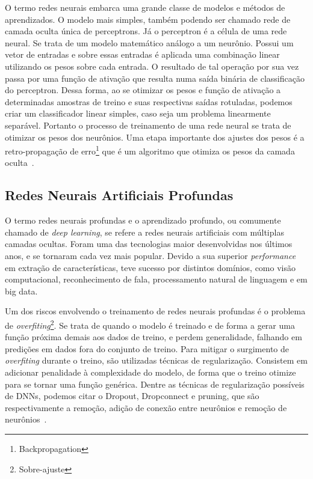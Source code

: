 O termo redes neurais embarca uma grande classe de modelos e métodos de aprendizados. O modelo mais simples, também podendo ser chamado rede de camada oculta única de perceptrons. Já o  perceptron é a célula de uma rede neural. Se trata de um modelo matemático análogo a um neurônio. Possui um vetor de entradas e sobre essas entradas é aplicada uma combinação linear utilizando os pesos sobre cada entrada. O resultado de tal operação por sua vez passa por uma função de ativação que resulta numa saída binária de classificação do perceptron. Dessa forma, ao se otimizar os pesos e função de ativação a determinadas amostras de treino e suas respectivas saídas rotuladas, podemos criar um classificador linear simples, caso seja um problema linearmente separável. Portanto o processo de treinamento de uma rede neural se trata de otimizar os pesos dos neurônios. Uma etapa importante dos ajustes dos pesos é a retro-propagação de erro\footnote{Backpropagation} que é um algoritmo que otimiza os pesos da camada oculta~\cite{hastie01statisticallearning}.

\subsection{Redes Neurais Artificiais Profundas}\label{sec:Cap2_redes_neurais_profundas}
O termo redes neurais profundas e o aprendizado profundo, ou comumente chamado de \textit{deep learning}, se refere a redes neurais artificiais com múltiplas camadas ocultas. Foram uma das tecnologias maior desenvolvidas nos últimos anos, e se tornaram cada vez mais popular. Devido a sua superior \textit{performance} em extração de características, teve sucesso por distintos domínios, como visão computacional, reconhecimento de fala, processamento natural de linguagem e em big data.

Um dos riscos envolvendo o treinamento de redes neurais profundas é o problema de \textit{overfiting}\footnote{Sobre-ajuste}. Se trata de quando o modelo é treinado e de forma a gerar uma função próxima demais aos dados de treino, e perdem generalidade, falhando em predições em dados fora do conjunto de treino. Para mitigar o surgimento de \textit{overfiting} durante o treino, são utilizadas técnicas de regularização. Consistem em adicionar penalidade à complexidade do modelo, de forma que o treino otimize para se tornar uma função genérica. Dentre as técnicas de regularização possíveis de DNNs, podemos citar o Dropout, Dropconnect e pruning, que são respectivamente a remoção, adição de conexão entre neurônios e remoção de neurônios~\cite{hastie01statisticallearning}.


